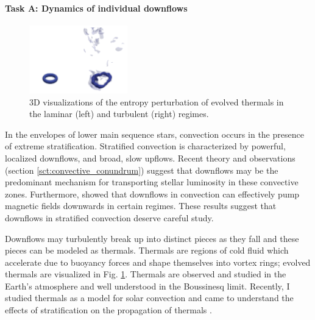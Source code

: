 \documentclass[aasms,11pt, longbibliography]{article}
\begin{document}
\paragraph{\fontsize{12.5pt}{14pt}\selectfont Task A: Dynamics of individual downflows}
\normalsize
\label{sct:taskA}
\begin{figure}
	\begin{center}
	\vspace{-10pt}
    \includegraphics[width=0.38\textwidth]{./figs/thermals_comparison.png}
	\vspace{-15pt}
	\end{center}
    \caption{
	3D visualizations of the entropy perturbation of evolved thermals in the laminar (left) and turbulent (right) regimes.
	\label{fig:thermals_comparison} }
\end{figure}

In the envelopes of lower main sequence stars, convection occurs in the presence of extreme stratification.
Stratified convection is characterized by powerful, localized downflows, and broad, slow upflows.
Recent theory and observations (section \ref{sct:convective_conundrum}) suggest that downflows may be the predominant mechanism for transporting stellar luminosity in these convective zones.
Furthermore, \citet{tobias&all1998} showed that downflows in convection can effectively pump magnetic fields downwards in certain regimes.
These results suggest that downflows in stratified convection deserve careful study.

Downflows may turbulently break up into distinct pieces as they fall and these pieces can be modeled as thermals.
Thermals are regions of cold fluid which accelerate due to buoyancy forces and shape themselves into vortex rings; evolved thermals are visualized in Fig. \ref{fig:thermals_comparison}.
Thermals are observed and studied in the Earth's atmosphere and well understood in the Boussinesq limit.
Recently, I studied thermals as a model for solar convection and came to understand the effects of stratification on the propagation of thermals \citep{andersLB2019}.
\end{document}
